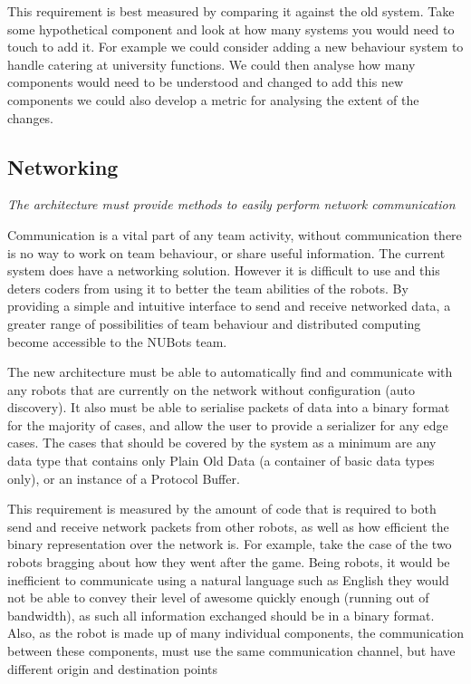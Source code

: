 \documentclass[english,12pt]{scrartcl}
\newcommand{\requirement}[1]{\textit{#1}}
\begin{document}
            This requirement is best measured by comparing it against the old system. Take some
            hypothetical component and look at how many systems you would need to touch to add it.
            For example we could consider adding a new behaviour system to handle catering at
            university functions. We could then analyse how many components would need to be
            understood and changed to add this new components we could also develop a metric for
            analysing the extent of the changes.
            
        
        \subsection{Networking}
            \requirement{The architecture must provide methods to easily perform network
            communication}
            
            Communication is a vital part of any team activity, without communication there is no
            way to work on team behaviour, or share useful information. The current system does have
            a networking solution. However it is difficult to use and this deters coders from using
            it to better the team abilities of the robots. By providing a simple and intuitive
            interface to send and receive networked data, a greater range of possibilities of team
            behaviour and distributed computing become accessible to the NUBots team.
            
            The new architecture must be able to automatically find and communicate with any robots
            that are currently on the network without configuration (auto discovery). It also must
            be able to serialise packets of data into a binary format for the majority of cases, and
            allow the user to provide a serializer for any edge cases. The cases that should be
            covered by the system as a minimum are any data type that contains only Plain Old Data
            (a container of basic data types only), or an instance of a Protocol Buffer. 
            
            
            This requirement is measured by the amount of code that is required to both send and
            receive network packets from other robots, as well as how efficient the binary
            representation over the network is. For example, take the case of the two robots
            bragging about how they went after the game. Being robots, it would be inefficient to
            communicate using a natural language such as English they would not be able to convey
            their level of awesome quickly enough (running out of bandwidth), as such all
            information exchanged should be in a binary format. Also, as the robot is made up of
            many individual components, the communication between these components, must use the
            same communication channel, but have different origin and destination points 
\end{document}
